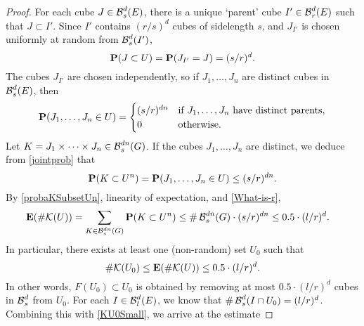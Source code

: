 \begin{proof}
	For each cube $J \in \operatorname{\mathcal{B}}_s^d(E)$, there is a unique `parent' cube $I' \in \operatorname{\mathcal{B}}_r^d(E)$ such that $J \subset I'$. Since $I'$ contains $(r/s)^d$ cubes of sidelength $s$, and $J_{I'}$ is chosen uniformly at random from $\operatorname{\mathcal{B}}^d_s(I')$,
	\[ \operatorname{\operatorname{\mathbf{P}}}(J \subset U) = \operatorname{\operatorname{\mathbf{P}}}(J_{I'} = J) = (s/r)^d. \]
	The cubes $J_{I'}$ are chosen independently, so if $J_1, \dots, J_n$ are distinct cubes in $\operatorname{\mathcal{B}}^d_s(E)$, then %
	\begin{equation}\label{jointprob}
	\operatorname{\operatorname{\mathbf{P}}}(J_1, \dots, J_n \in U) = \begin{cases} (s/r)^{dn} & \text{if $J_1, \dots, J_n$ have distinct parents,} \\ 0 & \text{otherwise}. \end{cases} 
	\end{equation}
	Let $K = J_1 \times \dots \times J_n \in \operatorname{\mathcal{B}}^{dn}_s(G)$. If the cubes $J_1, \dots, J_n$ are distinct, we deduce from \eqref{jointprob} that
	\begin{equation}\label{probaKSubsetUn}
		\operatorname{\operatorname{\mathbf{P}}}(K \subset U^n) = \operatorname{\operatorname{\mathbf{P}}}(J_1, \dots, J_n \in U) \leq (s/r)^{dn}.
	\end{equation}
	By \eqref{probaKSubsetUn}, linearity of expectation, and \eqref{What-is-r},
	\begin{align*}
		\operatorname{\operatorname{\mathbf{E}}}(\# \mathcal{K}(U)) &= \sum_{K \in \operatorname{\mathcal{B}}^{dn}_s(G)} \operatorname{\operatorname{\mathbf{P}}}(K \subset U^n) \leq \# \operatorname{\mathcal{B}}_s^{dn}(G) \cdot (s/r)^{dn}
		\leq 0.5 \cdot (l/r)^d.
	\end{align*}
	In particular, there exists at least one (non-random) set $U_0$ such that
	\begin{equation}\label{KU0Small}
		\# \mathcal{K}(U_0) \leq \operatorname{\operatorname{\mathbf{E}}}(\# \mathcal{K}(U)) \leq 0.5 \cdot (l/r)^d.
	\end{equation}
	 In other words, $F(U_0) \subset U_0$ is obtained by removing at most $0.5 \cdot (l/r)^d$ cubes in $\operatorname{\mathcal{B}}^d_s$ from $U_0$. For each $I \in \operatorname{\mathcal{B}}_l^d(E)$, we know that $\# \operatorname{\mathcal{B}}_{s}^d(I \cap U_0) = (l/r)^d$. Combining this with \eqref{KU0Small}, we arrive at the estimate 

\end{proof}
